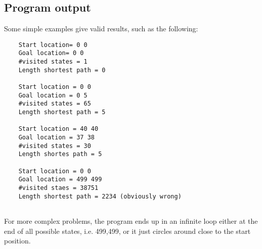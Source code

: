 \documentclass{article}
\begin{document}
	\subsection*{Program output}
	
	Some simple examples give valid results, such as the following:
	\begin{lstlisting}
	Start location= 0 0
	Goal location= 0 0
	#visited states = 1
	Length shortest path = 0
	
	Start location = 0 0
	Goal location = 0 5
	#visited states = 65
	Length shortest path = 5
	
	Start location = 40 40
	Goal location = 37 38
	#visited states = 30
	Length shortes path = 5
	
	Start location = 0 0
	Goal location = 499 499
	#visited staes = 38751
	Length shortest path = 2234 (obviously wrong)
	
	\end{lstlisting}
	
	For more complex problems, the program ends up in an infinite loop either at the end of all possible states, i.e. 499,499, or it just circles around close to the start position.
	
	
\end{document}
